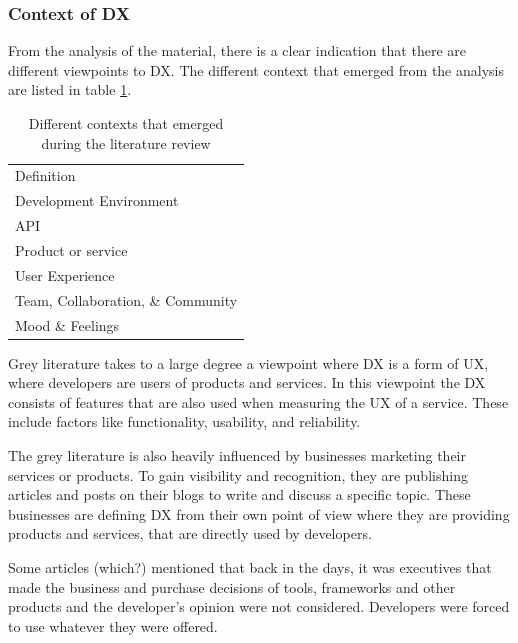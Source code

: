\documentclass[english, 12pt, a4paper, sci, utf8, a-1b, online]{aaltothesis}
\begin{document}
\subsubsection{Context of DX}

From the analysis of the material, there is a clear indication that there are different viewpoints to DX. The different context that emerged from the analysis are listed in table \ref{table:contexts}.

\begin{table}[H]
  \begin{center}
    \begin{tabular}{l}
      Definition                        \\
      Development Environment           \\
      API                               \\
      Product or service                \\
      User Experience                   \\
      Team, Collaboration, \& Community \\
      Mood \& Feelings                  \\
    \end{tabular}
    \captionsetup{width=0.6\textwidth}
    \caption{Different contexts that emerged during the literature review}
    \label{table:contexts}
  \end{center}
\end{table}

Grey literature takes to a large degree a viewpoint where DX is a form of UX, where developers are users of products and services. In this viewpoint the DX consists of features that are also used when measuring the UX of a service. These include factors like functionality, usability, and reliability.

The grey literature is also heavily influenced by businesses marketing their services or products. To gain visibility and recognition, they are publishing articles and posts on their blogs to write and discuss a specific topic. These businesses are defining DX from their own point of view where they are providing products and services, that are directly used by developers.

Some articles (which?) mentioned that back in the days, it was executives that made the business and purchase decisions of tools, frameworks and other products and the developer's opinion were not considered. Developers were forced to use whatever they were offered.
\end{document}

